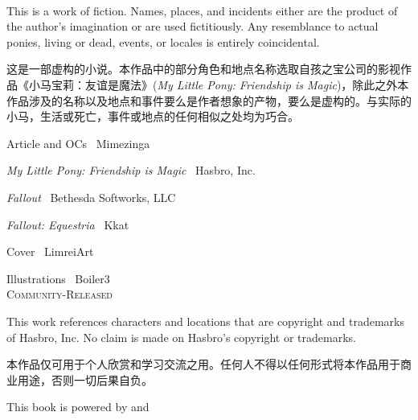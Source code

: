 \newpage

~\vfill

\thispagestyle{empty}

\begin{englishpar}
\noindent This is a work of fiction. Names, places, and incidents either are the product of the author's imagination or are used fictitiously. Any resemblance to actual ponies, living or dead, events, or locales is entirely coincidental.
\end{englishpar}

\noindent 这是一部虚构的小说。本作品中的部分角色和地点名称选取自孩之宝公司的影视作品《小马宝莉：友谊是魔法》(\emph{My Little Pony: Friendship is Magic})，除此之外本作品涉及的名称以及地点和事件要么是作者想象的产物，要么是虚构的。与实际的小马，生活或死亡，事件或地点的任何相似之处均为巧合。\\

\begin{englishpar}
\noindent Article and OCs \textcopyright\ Mimezinga

\noindent \emph{My Little Pony: Friendship is Magic} \textcopyright\ Hasbro, Inc.

\noindent \emph{Fallout} \textcopyright\ Bethesda Softworks, LLC

\noindent \emph{Fallout: Equestria} \textcopyright\ Kkat

\noindent Cover \textcopyright\ LimreiArt

\noindent Illustrations \textcopyright\ Boiler3 \\

\noindent \textsc{Community-Released}\\
\end{englishpar}

\begin{englishpar}
\noindent This work references characters and locations that are copyright and trademarks of Hasbro, Inc. No claim is made on Hasbro's copyright or trademarks.
\end{englishpar}

\noindent 本作品仅可用于个人欣赏和学习交流之用。任何人不得以任何形式将本作品用于商业用途，否则一切后果自负。\\

\begin{englishpar}
\noindent This book is powered by \XeLaTeX{} and \CTeX{}
\end{englishpar}

